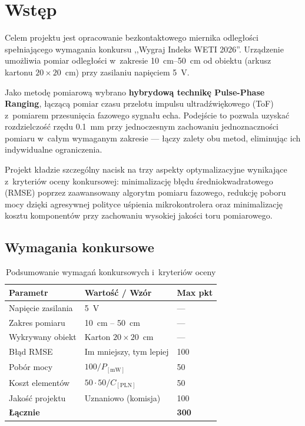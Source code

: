 \documentclass[a4paper,11pt]{article}
\begin{document}
	\section{Wstęp}
	\label{sec:wstep}
	
	Celem projektu jest opracowanie bezkontaktowego miernika odległości spełniającego
	wymagania konkursu ,,Wygraj Indeks WETI 2026''. Urządzenie umożliwia pomiar
	odległości w~zakresie \SIrange{10}{50}{\centi\metre} od obiektu (arkusz kartonu
	$20 \times 20$~\si{\centi\metre}) przy zasilaniu napięciem \SI{5}{\volt}.
	
	Jako metodę pomiarową wybrano \textbf{hybrydową technikę Pulse-Phase Ranging},
	łączącą pomiar czasu przelotu impulsu ultradźwiękowego (ToF) z~pomiarem
	przesunięcia fazowego sygnału echa. Podejście to pozwala uzyskać rozdzielczość
	rzędu \SI{0,1}{\milli\metre} przy jednoczesnym zachowaniu jednoznaczności pomiaru
	w~całym wymaganym zakresie --- łączy zalety obu metod, eliminując ich indywidualne
	ograniczenia.
	
	Projekt kładzie szczególny nacisk na trzy aspekty optymalizacyjne wynikające
	z~kryteriów oceny konkursowej: minimalizację błędu średniokwadratowego (RMSE)
	poprzez zaawansowany algorytm pomiaru fazowego, redukcję poboru mocy dzięki
	agresywnej polityce uśpienia mikrokontrolera oraz minimalizację kosztu
	komponentów przy zachowaniu wysokiej jakości toru pomiarowego.
	
	\subsection{Wymagania konkursowe}
	
	\begin{table}[H]
		\centering
		\caption{Podsumowanie wymagań konkursowych i~kryteriów oceny}
		\label{tab:wymagania}
		\begin{tabular}{lll}
			\toprule
			\textbf{Parametr}       & \textbf{Wartość / Wzór} & \textbf{Max pkt} \\
			\midrule
			Napięcie zasilania      & \SI{5}{\volt}  & --- \\
			Zakres pomiaru          & \SI{10}{\centi\metre} -- \SI{50}{\centi\metre} & --- \\
			Wykrywany obiekt        & Karton $20 \times 20$~\si{\centi\metre} & --- \\
			Błąd RMSE               & Im mniejszy, tym lepiej & 100 \\
			Pobór mocy              & $100 / P_{[\si{\milli\watt}]}$ & 50 \\
			Koszt elementów         & $50 \cdot 50 / C_{[\text{PLN}]}$ & 50 \\
			Jakość projektu         & Uznaniowo (komisja) & 100 \\
			\midrule
			\textbf{Łącznie}        & & \textbf{300} \\
			\bottomrule
		\end{tabular}
	\end{table}
	
\end{document}
